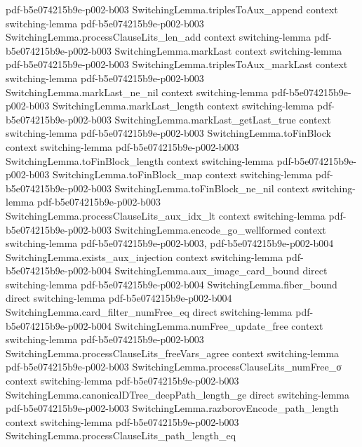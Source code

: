 \begin{lemma}
{    pdf-b5e074215b9e-p002-b003}
\proofstep
  {SwitchingLemma.triplesToAux_append}
  {context}
  {switching-lemma}
  {pdf-b5e074215b9e-p002-b003}
\proofstep
  {SwitchingLemma.processClauseLits_len_add}
  {context}
  {switching-lemma}
  {pdf-b5e074215b9e-p002-b003}
\proofstep
  {SwitchingLemma.markLast}
  {context}
  {switching-lemma}
  {pdf-b5e074215b9e-p002-b003}
\proofstep
  {SwitchingLemma.triplesToAux_markLast}
  {context}
  {switching-lemma}
  {pdf-b5e074215b9e-p002-b003}
\proofstep
  {SwitchingLemma.markLast_ne_nil}
  {context}
  {switching-lemma}
  {pdf-b5e074215b9e-p002-b003}
\proofstep
  {SwitchingLemma.markLast_length}
  {context}
  {switching-lemma}
  {pdf-b5e074215b9e-p002-b003}
\proofstep
  {SwitchingLemma.markLast_getLast_true}
  {context}
  {switching-lemma}
  {pdf-b5e074215b9e-p002-b003}
\proofstep
  {SwitchingLemma.toFinBlock}
  {context}
  {switching-lemma}
  {pdf-b5e074215b9e-p002-b003}
\proofstep
  {SwitchingLemma.toFinBlock_length}
  {context}
  {switching-lemma}
  {pdf-b5e074215b9e-p002-b003}
\proofstep
  {SwitchingLemma.toFinBlock_map}
  {context}
  {switching-lemma}
  {pdf-b5e074215b9e-p002-b003}
\proofstep
  {SwitchingLemma.toFinBlock_ne_nil}
  {context}
  {switching-lemma}
  {pdf-b5e074215b9e-p002-b003}
\proofstep
  {SwitchingLemma.processClauseLits_aux_idx_lt}
  {context}
  {switching-lemma}
  {pdf-b5e074215b9e-p002-b003}
\proofstep
  {SwitchingLemma.encode_go_wellformed}
  {context}
  {switching-lemma}
  {pdf-b5e074215b9e-p002-b003,
    pdf-b5e074215b9e-p002-b004}
\proofstep
  {SwitchingLemma.exists_aux_injection}
  {context}
  {switching-lemma}
  {pdf-b5e074215b9e-p002-b004}
\proofstep
  {SwitchingLemma.aux_image_card_bound}
  {direct}
  {switching-lemma}
  {pdf-b5e074215b9e-p002-b004}
\proofstep
  {SwitchingLemma.fiber_bound}
  {direct}
  {switching-lemma}
  {pdf-b5e074215b9e-p002-b004}
\proofstep
  {SwitchingLemma.card_filter_numFree_eq}
  {direct}
  {switching-lemma}
  {pdf-b5e074215b9e-p002-b004}
\proofstep
  {SwitchingLemma.numFree_update_free}
  {context}
  {switching-lemma}
  {pdf-b5e074215b9e-p002-b003}
\proofstep
  {SwitchingLemma.processClauseLits_freeVars_agree}
  {context}
  {switching-lemma}
  {pdf-b5e074215b9e-p002-b003}
\proofstep
  {SwitchingLemma.processClauseLits_numFree_σ}
  {context}
  {switching-lemma}
  {pdf-b5e074215b9e-p002-b003}
\proofstep
  {SwitchingLemma.canonicalDTree_deepPath_length_ge}
  {direct}
  {switching-lemma}
  {pdf-b5e074215b9e-p002-b003}
\proofstep
  {SwitchingLemma.razborovEncode_path_length}
  {context}
  {switching-lemma}
  {pdf-b5e074215b9e-p002-b003}
\proofstep
  {SwitchingLemma.processClauseLits_path_length_eq}

\end{lemma}
